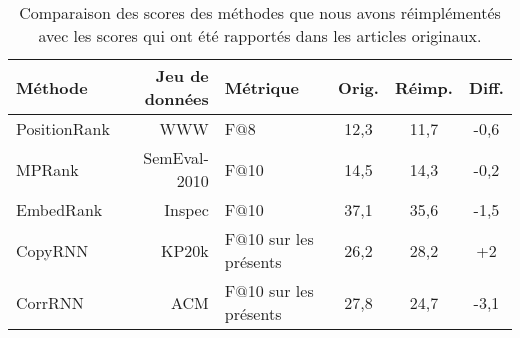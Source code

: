 \begin{table}[!htb]
    \centering
    \begin{tabular}{lrlccc}
    \toprule
    \textbf{Méthode} & \textbf{Jeu de données} & \textbf{Métrique} & \textbf{Orig.} & \textbf{Réimp.} & \textbf{Diff.} \\
    \midrule
        PositionRank & \small{WWW} & \small{F$@$8}       & 12,3 & 11,7 & -0,6 \\%
        MPRank & \small{SemEval-2010} & \small{F$@$10}   & 14,5 & 14,3 & -0,2 \\
        EmbedRank & \small{Inspec} & \small{F$@$10}   & 37,1 & 35,6  & -1,5 \\ %
        CopyRNN & \small{KP20k} & \small{F$@$10 sur les présents} & 26,2 & 28,2 & +2 \\
        CorrRNN & \small{ACM} & \small{F$@$10 sur les présents} & 27,8 & 24,7 & -3,1 \\ %
    \bottomrule
    \end{tabular}
    \caption{Comparaison des scores des méthodes que nous avons réimplémentés avec les scores qui ont été rapportés dans les articles originaux.}
    \label{tab:replicability}
\end{table}


